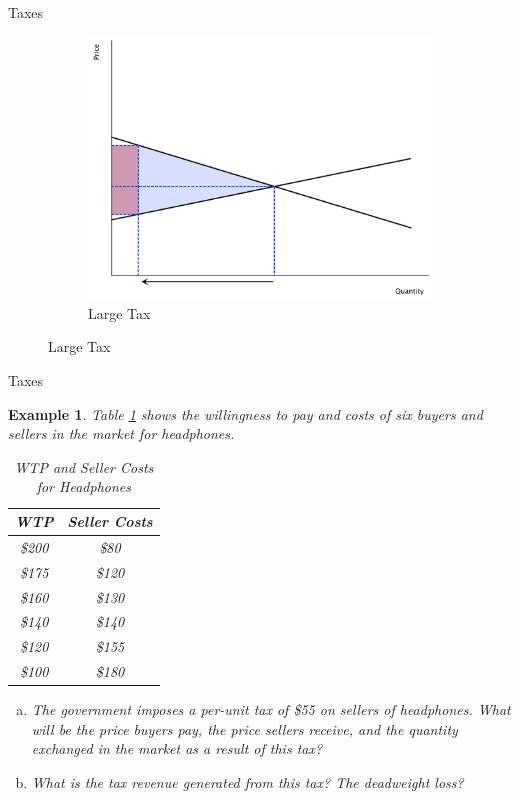 \documentclass[xcolor={dvipsnames},pdf, hyperref={colorlinks=true, citecolor=ForestGreen, linkcolor=BlueViolet, urlcolor=Magenta}]{beamer}
\newtheorem{exmp}{Example}[section]
\begin{document}
\begin{frame}{Taxes}
\begin{figure}[H]
\begin{subfigure}{.3\textwidth}
			\includegraphics[scale=.15]{plot49.pdf}
			\caption{Large Tax}
		\end{subfigure}
	\end{figure} 
	
\end{frame}



\begin{frame}{Taxes}
	\begin{exmp}
		\scriptsize
		Table \ref{SA1} shows the willingness to pay and costs of six buyers and sellers in the market for headphones.
		
		\begin{table}[H]
			\caption{\scriptsize WTP and Seller Costs for Headphones}
			\centering
			\begin{tabular}{c|c} 
				
				WTP   & Seller Costs \\
				\hline
				\$200 & \$80 \\
				\$175 & \$120 \\
				\$160 & \$130 \\
				\$140 & \$140 \\
				\$120 & \$155 \\
				\$100 & \$180 \\
			\end{tabular}
			\label{SA1}
		\end{table}
		\begin{enumerate}[(a)]
			\item The government imposes a per-unit tax of \$55 on sellers of headphones. What will be the price buyers pay, the price sellers receive, and the quantity exchanged in the market as a result of this tax? 
			\item What is the tax revenue generated from this tax? The deadweight loss?
		\end{enumerate}
	\end{exmp}
\end{frame}
\end{document}
